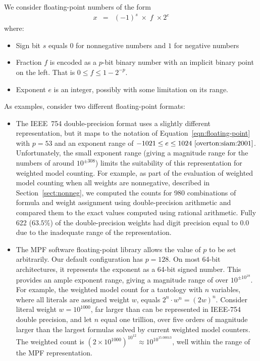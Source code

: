 \documentclass[letterpaper,USenglish,cleveref, autoref, thm-restate]{lipics-v2021}
\begin{document}
We consider floating-point numbers of the form
\begin{eqnarray}
x & = & (-1)^s \; \times \; f \; \times 2^{e} \label{eqn:floating-point}
\end{eqnarray}
where:
\begin{itemize}
\item Sign bit $s$ equals $0$ for nonnegative numbers and $1$ for negative numbers
\item Fraction $f$ is encoded as a $p$-bit binary number with an implicit binary point on the left.  That is $0 \leq f \leq 1-2^{-p}$.
\item Exponent $e$ is an integer, possibly with some limitation on its range.
\end{itemize}
As examples, consider two different floating-point formats:
\begin{itemize}
\item The IEEE~754 double-precision format uses a slightly different
  representation, but it maps to the notation of
  Equation~\ref{eqn:floating-point} with $p=53$ and an exponent range
  of $-1021 \leq e \leq 1024~\cite{overton:siam:2001}$.
  Unfortunately, the small exponent range (giving a magnitude range
  for the numbers of around $10^{\pm 308}$) limits the suitability of
  this representation for weighted model counting.  For example, as
  part of the evaluation of weighted model counting when all weights
  are nonnegative, described in Section~\ref{sect:nonneg}, we computed
  the counts for 980 combinations of formula and weight assignment
  using double-precision arithmetic and compared them to the exact
  values computed using rational arithmetic.  Fully 622 ($63.5\%$) of
  the double-precision weights had digit precision equal to $0.0$ due
  to the inadequate range of the representation.
\item The MPF software floating-point library allows the value of $p$
  to be set arbitrarily.  Our default configuration has $p=128$. On
  most 64-bit architectures, it represents the exponent as a 64-bit
  signed number.  This provides an ample exponent range, giving a
  magnitude range of over $10^{\pm 10^{18}}$.
  For example, the weighted model count for a tautology with $n$ variables, where all literals are assigned weight $w$, equals
  $2^n\cdot w^n = (2w)^n$.  Consider literal weight $w=10^{1000}$,
 far larger than can be represented in IEEE-754 double precision, and let $n$ equal one trillion, over five orders of magnitude
 larger than the largest formulas solved by current weighted model counters.  The weighted count is
 $(2 \times 10^{1000})^{10^{12}} \approx 10^{10^{15.00013}}$, well within the range of the MPF representation.
\end{itemize}
\end{document}
